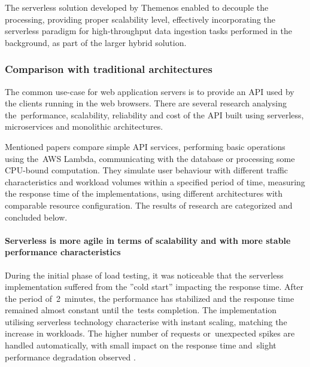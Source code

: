 The serverless solution developed by Themenos enabled to decouple the processing, providing proper scalability level, effectively incorporating the serverless paradigm for high-throughput data ingestion tasks performed in the background, as part of the larger hybrid solution.

\subsubsection{Comparison with traditional architectures} \label{chapter:comparison-with-traditional-architectures}

The common use-case for web application servers is to provide an API used by the clients running in the web browsers.
There are several research \cite{ServerlessComputingAnInvestigationOfDeploymentEnvironmentsForWebAPIs} \cite{MicroservicesvsServerlessAPerformanceComparisonOnCloudNativeWebApplication} analysing the~performance, scalability, reliability and cost of the API built using serverless, microservices and monolithic architectures.

Mentioned papers compare simple API services, performing basic operations using the~AWS Lambda, communicating with the database or processing some CPU-bound computation.
They simulate user behaviour with different traffic characteristics and workload volumes within a specified period of time, measuring the response time of the implementations, using different architectures with comparable resource configuration. The results of research are categorized and concluded below.

\paragraph{Serverless is more agile in terms of scalability and with more stable performance characteristics}

During the initial phase of load testing, it was noticeable that the serverless implementation suffered from the ''cold start'' impacting the response time.
After the period of~2~minutes, the performance has stabilized and the response time remained almost constant until the~tests completion.
The implementation utilising serverless technology characterise with instant scaling, matching the increase in workloads.
The higher number of requests or~unexpected spikes are handled automatically, with small impact on the response time and~slight performance degradation observed \cite{ServerlessComputingAnInvestigationOfDeploymentEnvironmentsForWebAPIs}.

